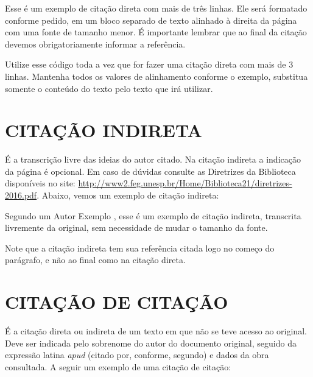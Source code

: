 \documentclass[
  12pt,		%
  a4paper,	%
  openright,%
  oneside,	%
  chapter=TITLE,		%
  section=TITLE,		%
  english,	%
  french,	%
  spanish,	%
  brazil
]{abntex2}
\begin{document}
            \vspace{1.5pt}
            \begin{flushright}
                \begin{minipage}{.724\textwidth}
                    {\SingleSpacing\small
                    Esse é um exemplo de citação direta com mais de três linhas. Ele será formatado conforme pedido, em um bloco separado de texto alinhado à direita da página com uma fonte de tamanho menor. É importante lembrar que ao final da citação devemos obrigatoriamente informar a referência. \cite[p.~3--4]{livro}
                    }
                \end{minipage}
            \end{flushright}
            \vspace{1.5pt}
             
             Utilize esse código toda a vez que for fazer uma citação direta com mais de 3 linhas. Mantenha todos os valores de alinhamento conforme o exemplo, substitua somente o conteúdo do texto pelo texto que irá utilizar.
             
        \section{CITAÇÃO INDIRETA}
        
            É a transcrição livre das ideias do autor citado. Na citação indireta a indicação da página é opcional. Em caso de dúvidas consulte as Diretrizes da Biblioteca disponíveis no site: \url{http://www2.feg.unesp.br/Home/Biblioteca21/diretrizes-2016.pdf}. Abaixo, vemos um exemplo de citação indireta:
            
            Segundo um Autor Exemplo \cite{livro}, esse é um exemplo de citação indireta, transcrita livremente da original, sem necessidade de mudar o tamanho da fonte.
            
            Note que a citação indireta tem sua referência citada logo no começo do parágrafo, e não ao final como na citação direta.
            
        \section{CITAÇÃO DE CITAÇÃO}
            
            É a citação direta ou indireta de um texto em que não se teve acesso ao original. Deve ser indicada pelo sobrenome do autor do documento original, seguido da expressão latina \textit{apud} (citado por, conforme, segundo) e dados da obra consultada. A seguir um exemplo de uma citação de citação:
            
\end{document}
